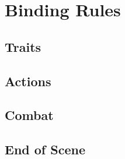 \documentclass[a4paper,openany]{book}
\date{\today}
\begin{document}
\frontmatter

\section*{Binding Rules}

\begin{multicols}{2}

\subsection*{Traits}











\subsection*{Actions}






\subsection*{Combat}





\subsection*{End of Scene}



\end{multicols}
\end{document}
